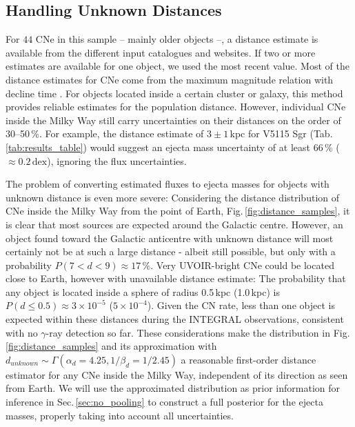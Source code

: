 \documentclass{aa}
\newcommand{\mrm}[1]{\mathrm{#1}}
\begin{document}
\subsection{Handling Unknown Distances}\label{sec:unknown_distances}
%
For $44$ CNe in this sample -- mainly older objects --, a distance estimate is available from the different input catalogues and websites.
%
If two or more estimates are available for one object, we used the most recent value.
%
Most of the distance estimates for CNe come from the maximum magnitude relation with decline time \citep[MMRD,][]{Zwicky1936_MMRD,McLaughlin1940_MMRD,Buscombe1955_MMRD}.
%
For objects located inside a certain cluster or galaxy, this method provides reliable estimates for the population distance.
%
However, individual CNe inside the Milky Way still carry uncertainties on their distances on the order of 30--50\,\%.
%
For example, the distance estimate of $3 \pm 1$\,kpc  for V5115 Sgr (Tab.\,\ref{tab:results_table}) would suggest an ejecta mass uncertainty of at least $66\,\%$ ($\approx 0.2\,\mrm{dex}$), ignoring the flux uncertainties.

The problem of converting estimated fluxes to ejecta masses for objects with unknown distance is even more severe:
%
Considering the distance distribution of CNe inside the Milky Way from the point of Earth, Fig.\,\ref{fig:distance_samples}, it is clear that most sources are expected around the Galactic centre.
%
However, an object found toward the Galactic anticentre with unknown distance will most certainly not be at such a large distance - albeit still possible, but only with a probability $P(7 < d < 9) \approx 17\,\%$.
%
Very UVOIR-bright CNe could be located close to Earth, however with unavailable distance estimate:
%
The probability that any object is located inside a sphere of radius 0.5\,kpc (1.0\,kpc) is $P(d \leq 0.5) \approx 3 \times 10^{-5}$ ($5 \times 10^{-4}$).
%
Given the CN rate, less than one object is expected within these distances during the INTEGRAL observations, consistent with no $\gamma$-ray detection so far.
%
These considerations make the distribution in Fig.\,\ref{fig:distance_samples} and its approximation with $d_{unknown} \sim \Gamma(\alpha_d = 4.25,1/\beta_d = 1/2.45)$ a reasonable first-order distance estimator for any CNe inside the Milky Way, independent of its direction as seen from Earth.
%
We will use the approximated distribution as prior information for inference in Sec.\,\ref{sec:no_pooling} to construct a full posterior for the ejecta masses, properly taking into account all uncertainties.
\end{document}

